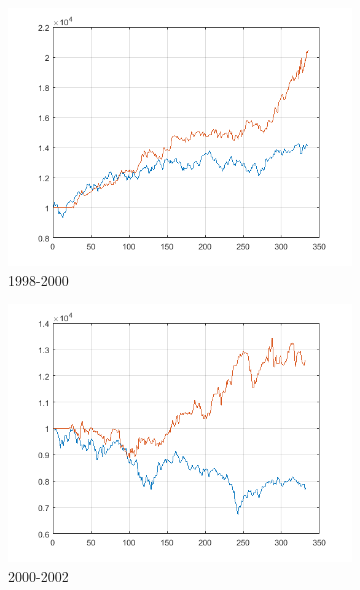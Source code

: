\documentclass[11pt,a4,twosided,singlespacing,titlepagenumber=on]{scrreprt}
\numberwithin{equation}{chapter} %
\theoremstyle{remark}
\begin{document}
\begin{figure}[H]
\begin{subfigure}[t]{0.32\textwidth}
        \includegraphics[width=1\textwidth]{res/backtest/5}
        \caption{1998-2000}
    \end{subfigure}
    \begin{subfigure}[t]{0.32\textwidth}
        \centering
        \includegraphics[width=1\textwidth]{res/backtest/6}
        \caption{2000-2002}
    \end{subfigure}
    \begin{subfigure}[t]{0.32\textwidth}
        \centering

\end{subfigure}
\end{figure}
\end{document}
